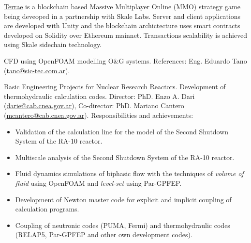\documentclass[11pt,a4paper,sans]{moderncv}        %
\begin{document}
{\href{http://terraegame.com/}{Terrae} is a blockchain based Massive Multiplayer Online (MMO) strategy game being deveoped in a partnership with Skale Labs.
Server and client applications are developed with Unity and the blockchain archictecture uses smart contracts developed on Solidity over Ethereum mainnet.
Transactions scalability is achieved using Skale sidechain technology.}

{CFD using OpenFOAM modelling O\&G systems.\newline{}
References: Eng. Eduardo Tano (\href{mailto:tano@sic-tec.com.ar}{tano@sic-tec.com.ar}).
}

{Basic Engineering Projects for Nuclear Research Reactors.\newline{}%
Development of thermohydraulic calculation codes.\newline{}%
Director: PhD. Enzo A. Dari (\href{mailto:darie@cab.cnea.gov.ar}{darie@cab.cnea.gov.ar}), Co-director: PhD. Mariano Cantero (\href{mailto:mcantero@cab.cnea.gov.ar}{mcantero@cab.cnea.gov.ar}).\newline{}%
Responsibilities and achievements:%
\begin{itemize}%
\item Validation of the calculation line for the model of the Second Shutdown System of the RA-10 reactor.
\item Multiscale analysis of the Second Shutdown System of the RA-10 reactor.
\item Fluid dynamics simulations of biphasic flow with the techniques of \textit{volume of fluid} using OpenFOAM and \textit{level-set} using Par-GPFEP.
\item Development of Newton master code for explicit and implicit coupling of calculation programs.
\item Coupling of neutronic codes (PUMA, Fermi) and thermohydraulic codes (RELAP5, Par-GPFEP and other own development codes).
\end{itemize}}
\end{document}
